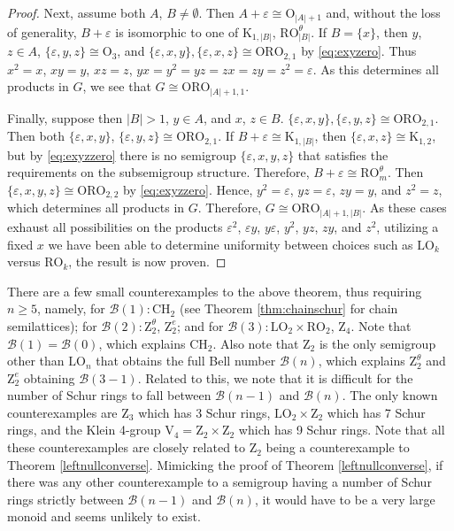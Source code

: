 \documentclass{article}
\theoremstyle{plain}
\theoremstyle{definition}
\newcommand{\B}{\mathscr{B}}
\renewcommand{\O}{\mathrm{O}}
\newcommand{\K}{\mathrm{K}}
\newcommand{\LO}{\mathrm{LO}}
\newcommand{\RO}{\mathrm{RO}}
\newcommand{\ORO}{\mathrm{ORO}}
\newcommand{\CH}{\mathrm{CH}}
\newcommand{\z}{\mathrm{Z}}
\begin{document}
\begin{proof}
Next, assume both $A$, $B\neq\emptyset$. Then $A+\varepsilon\cong \O_{|A|+1}$ and, without the loss of generality, $B+\varepsilon$ is isomorphic to one of $\K_{1,|B|}$, $\RO_{|B|}^\theta$. If $B=\{x\}$, then $y$, $z\in A$, $\{\varepsilon, y,z\}\cong \O_3$, and $\{\varepsilon, x,y\}, \{\varepsilon,x,z\}\cong \ORO_{2,1}$ by \eqref{eq:exyzero}. Thus $x^2=x$, $xy=y$, $xz=z$, $yx=y^2=yz=zx=zy=z^2=\varepsilon$. As this determines all products in $G$, we see that $G\cong \ORO_{|A|+1,1}$.

Finally, suppose then $|B|>1$, $y\in A$, and $x$, $z\in B$. 
$\{\varepsilon, x,y\}, \{\varepsilon,y,z\}\cong \ORO_{2,1}$. Then both $\{\varepsilon, x,y\}$, $\{\varepsilon,y,z\}\cong \ORO_{2,1}$. If $B+\varepsilon\cong \K_{1,|B|}$, then $\{\varepsilon, x,z\}\cong \K_{1,2}$, but by \eqref{eq:exyzzero} there is no semigroup $\{\varepsilon,x,y,z\}$ that satisfies the requirements on the subsemigroup structure. Therefore, $B+\varepsilon\cong \RO_m^\theta$. Then $\{\varepsilon,x,y,z\}\cong \ORO_{2,2}$ by \eqref{eq:exyzzero}. Hence, $y^2=\varepsilon$, $yz=\varepsilon$, $zy=y$, and $z^2=z$, which determines all products in $G$. Therefore, $G\cong \ORO_{|A|+1,|B|}$. As these cases exhaust all possibilities on the products $\varepsilon^2$, $\varepsilon y$, $y\varepsilon$, $y^2$, $yz$, $zy$, and $z^2$, utilizing a fixed $x$ we have been able to determine uniformity between choices such as $\LO_k$ versus $\RO_k$, the result is now proven.
\end{proof}

There are a few small counterexamples to the above theorem, thus requiring $n\ge 5$, namely, for $\B(1) \colon \CH_2$ (see Theorem \ref{thm:chainschur} for chain semilattices); for $\B(2) \colon \z_2^\theta$, $\z_2^e$; and for $\B(3) \colon \LO_2\times \RO_2$, $\z_4$. Note that $\B(1)=\B(0)$, which explains $\CH_2$. Also note that $\z_2$ is the only semigroup other than $\LO_n$ that obtains the full Bell number $\B(n)$, which explains $\z_2^\theta$ and $\z_2^e$ obtaining $\B(3-1)$. Related to this, we note that it is difficult for the number of Schur rings to fall between $\B(n-1)$ and $\B(n)$. The only known counterexamples are $\z_3$ which has 3 Schur rings, $\LO_2\times \z_2$ which has 7 Schur rings, and the Klein 4-group $\text{V}_4 = \z_2\times \z_2$ which has 9 Schur rings. Note that all these counterexamples are closely related to $\z_2$ being a counterexample to Theorem \ref{leftnullconverse}. Mimicking the proof of Theorem \ref{leftnullconverse}, if there was any other counterexample to a semigroup having a number of Schur rings strictly between $\B(n-1)$ and $\B(n)$, it would have to be a very large monoid and seems unlikely to exist.
\end{document}

